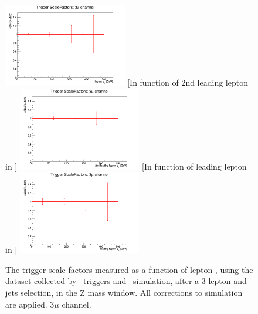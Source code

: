 \begin{figure}[tb]
	[In function of lepton \pt]{
		\includegraphics[width=0.48\textwidth]{Appendix/Figures/trigger/ScaleFactors/3mu/SF_trigger_3muhistPt.png}
		\label{image:3muhistPt.png}
	}
	[In function of 2nd leading lepton in \pt]{
		\includegraphics[width=0.48\textwidth]{Appendix/Figures/trigger/ScaleFactors/3mu/SF_trigger_3muhistPt_2ndleadinglep.png}
		\label{image:3muhistPt_2ndleadinglep.png}
	}
	[In function of leading lepton in \pt]{
		\includegraphics[width=0.48\textwidth]{Appendix/Figures/trigger/ScaleFactors/3mu/SF_trigger_3muhistPt_leadinglep.png}
		\label{image:3muhistPt_leadinglep.png}
	}
	\caption{The trigger scale factors measured as a function of lepton \pt, using the dataset collected by \Etmis\ triggers and \WZ\ simulation, after a 3 lepton and jets selection, in the Z mass window. All corrections to simulation are applied. 3$\mu$ channel.}
	\label{image:FigurestriggerScaleFactors3mu}
\end{figure}

